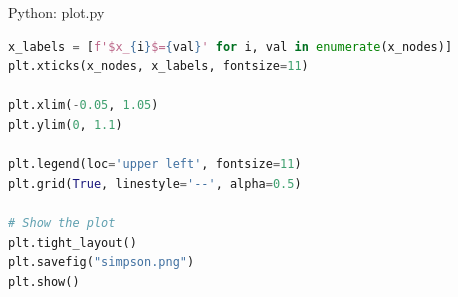 \documentclass{beamer}
\begin{document}
\begin{frame}[fragile]{Python: plot.py}
\begin{lstlisting}[language=Python]
x_labels = [f'$x_{i}$={val}' for i, val in enumerate(x_nodes)]
plt.xticks(x_nodes, x_labels, fontsize=11)

plt.xlim(-0.05, 1.05)
plt.ylim(0, 1.1) 

plt.legend(loc='upper left', fontsize=11)
plt.grid(True, linestyle='--', alpha=0.5)

# Show the plot
plt.tight_layout()
plt.savefig("simpson.png")
plt.show()
\end{lstlisting}
\end{frame}
\end{document}
